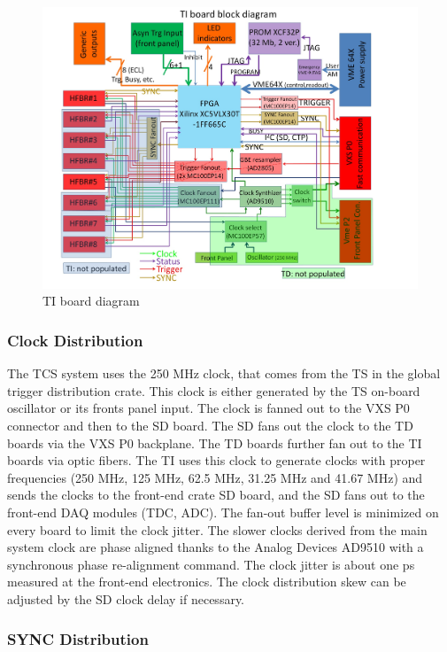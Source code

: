 \begin{figure}[hbt]
	\centering
	\includegraphics[width=1.0\columnwidth,keepaspectratio]{img/TIdiagram.jpg}
	\caption{TI board diagram}
	\label{fig:TIdiagram}
\end{figure}


\subsubsection{Clock Distribution}

The TCS system uses the 250 MHz clock, that comes from the TS in the global trigger distribution crate.  This clock is either generated by the TS on-board oscillator or its fronts panel input.  The clock is fanned out to the VXS P0 connector and then to the SD board.  The SD fans out the clock to the TD boards via the VXS P0 backplane.  The TD boards further fan out to the TI boards via optic fibers.  The TI uses this clock to generate clocks with proper frequencies (250 MHz, 125 MHz, 62.5 MHz, 31.25 MHz and 41.67 MHz) and sends the clocks to the front-end crate SD board, and the SD fans out to the front-end DAQ modules (TDC, ADC).  The fan-out buffer level is minimized on every board to limit the clock jitter.  The slower clocks derived from the main system clock are phase aligned thanks to the Analog Devices AD9510 with a synchronous phase re-alignment command.  The clock jitter is about one ps measured at the front-end electronics.  The clock distribution skew can be adjusted by the SD clock delay if necessary.


\subsubsection{SYNC Distribution}

